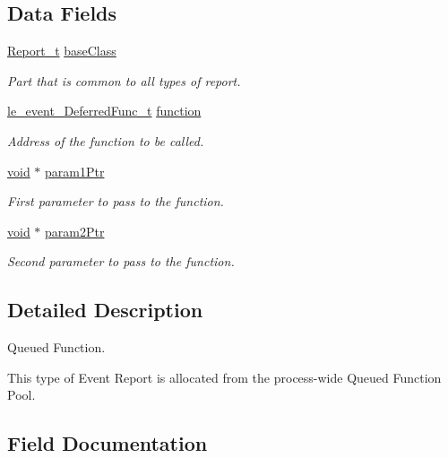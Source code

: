 \subsection*{Data Fields}
\begin{DoxyCompactItemize}
\item 
\hyperlink{struct_report__t}{Report\+\_\+t} \hyperlink{struct_queued_function_report__t_a86e995280cca922b16941c25402107cb}{base\+Class}
\begin{DoxyCompactList}\small\item\em Part that is common to all types of report. \end{DoxyCompactList}\item 
\hyperlink{le__event_loop_8h_a6f86581d4d2bf24647d5efaff1046d5d}{le\+\_\+event\+\_\+\+Deferred\+Func\+\_\+t} \hyperlink{struct_queued_function_report__t_a9959977af45c63ecca8b6f300b330f9a}{function}
\begin{DoxyCompactList}\small\item\em Address of the function to be called. \end{DoxyCompactList}\item 
\hyperlink{_t_e_m_p_l_a_t_e__cdef_8h_ac9c84fa68bbad002983e35ce3663c686}{void} $\ast$ \hyperlink{struct_queued_function_report__t_a6d241c86ac478bea83745e1b680bf4fa}{param1\+Ptr}
\begin{DoxyCompactList}\small\item\em First parameter to pass to the function. \end{DoxyCompactList}\item 
\hyperlink{_t_e_m_p_l_a_t_e__cdef_8h_ac9c84fa68bbad002983e35ce3663c686}{void} $\ast$ \hyperlink{struct_queued_function_report__t_ad0c4ded7e1c5876a792fc8f857c1962a}{param2\+Ptr}
\begin{DoxyCompactList}\small\item\em Second parameter to pass to the function. \end{DoxyCompactList}\end{DoxyCompactItemize}


\subsection{Detailed Description}
Queued Function.

This type of Event Report is allocated from the process-\/wide Queued Function Pool. 

\subsection{Field Documentation}

